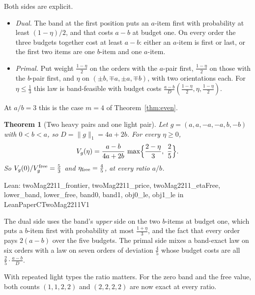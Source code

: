 \documentclass[conference]{IEEEtran}
\newtheorem{theorem}{Theorem}
\theoremstyle{definition}
\newcommand{\lean}[1]{\textsf{\footnotesize #1}}
\newcommand{\leanbox}[1]{%
  \par\vspace{2pt}\noindent
  {\raggedright\footnotesize\textsf{Lean: #1}\par}\vspace{2pt}}
\begin{document}
Both sides are explicit.
\begin{itemize}
\item \emph{Dual.} The band at the first position puts an $a$-item first with probability at
least $(1-\eta)/2$, and that costs $a-b$ at budget one. On every order the three budgets
together cost at least $a-b$: either an $a$-item is first or last, or the first two items are one
$b$-item and one $a$-item.
\item \emph{Primal.} Put weight $\frac{1-\eta}2$ on the orders with the $a$-pair first,
$\frac{1-\eta}2$ on those with the $b$-pair first, and $\eta$ on
$(\pm b,\mp a,\pm a,\mp b)$, with two orientations each. For $\eta\le\frac13$ this law is
band-feasible with budget costs $\frac{a-b}{D}(\frac{1-\eta}2,\eta,\frac{1-\eta}2)$.
\end{itemize}
At $a/b=3$ this is the case $m=4$ of Theorem~\ref{thm:even}.

\begin{theorem}[Two heavy pairs and one light pair]
\label{thm:twomag2211}
Let $g=(a,a,-a,-a,b,-b)$ with $0<b<a$, so $D=\|g\|_1=4a+2b$. For every $\eta\ge0$,
\[
V_g(\eta)=\frac{a-b}{4a+2b}\,\max\Bigl\{\frac{2-\eta}3,\ \frac25\Bigr\}.
\]
So $V_g(0)/V_g^{\rm free}=\frac53$ and $\eta_{\rm free}=\frac45$, at every ratio $a/b$.
\end{theorem}
\leanbox{\lean{twoMag2211\_frontier}, \lean{twoMag2211\_price}, \lean{twoMag2211\_etaFree},
\lean{lower\_band}, \lean{lower\_free}, \lean{band0}, \lean{band1}, \lean{obj0\_le},
\lean{obj1\_le} in \lean{LeanPaperCTwoMag2211V1}}

The dual side uses the band's \emph{upper} side on the two $b$-items at budget one, which puts a
$b$-item first with probability at most $\frac{1+\eta}3$, and the fact that every order pays
$2(a-b)$ over the five budgets. The primal side mixes a band-exact law on six orders with a law
on seven orders of deviation $\frac45$ whose budget costs are all $\frac25\cdot\frac{a-b}{D}$.

With repeated light types the ratio matters. For the zero band and the free value, both counts
$(1,1,2,2)$ and $(2,2,2,2)$ are now exact at every ratio.
\end{document}

